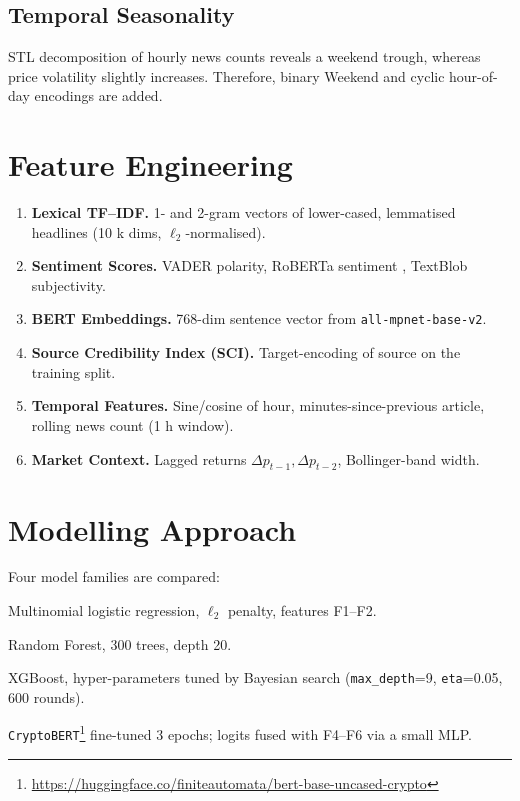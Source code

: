 \documentclass[12pt,a4paper]{article}
\begin{document}
\subsection{Temporal Seasonality}
STL decomposition of hourly news counts reveals a weekend trough,
whereas price volatility slightly increases.  Therefore, binary
\textsf{Weekend} and cyclic hour-of-day encodings are added.

\section{Feature Engineering}\label{sec:features}
\begin{enumerate}[label=\textbf{F\arabic*}.]
\item \textbf{Lexical TF–IDF.} 1- and 2-gram vectors of lower-cased,
      lemmatised headlines (10 k dims, $\ell_2$-normalised).
\item \textbf{Sentiment Scores.} VADER polarity, RoBERTa
      sentiment \cite{roberta}, TextBlob subjectivity.
\item \textbf{BERT Embeddings.} 768-dim sentence vector from
      \texttt{all-mpnet-base-v2}.
\item \textbf{Source Credibility Index (SCI).}
      Target-encoding of source on the training split.
\item \textbf{Temporal Features.} Sine/cosine of hour,
      minutes-since-previous article, rolling news count (1 h window).
\item \textbf{Market Context.} Lagged returns
      \(\Delta p_{t-1}, \Delta p_{t-2}\), Bollinger-band width.
\end{enumerate}

\section{Modelling Approach}
Four model families are compared:

\begin{description}[leftmargin=1.8cm,style=nextline]
\item[LogReg] Multinomial logistic regression, $\ell_2$ penalty,
             features F1–F2.
\item[RF] Random Forest, 300 trees, depth 20.
\item[XGB] XGBoost, hyper-parameters tuned by Bayesian search
           (\texttt{max\_depth}=9, \texttt{eta}=0.05, 600 rounds).
\item[BERT] \texttt{CryptoBERT}\footnote{\url{https://huggingface.co/finiteautomata/bert-base-uncased-crypto}}
           fine-tuned 3 epochs; logits fused with F4–F6 via a small MLP.
\end{description}
\end{document}
